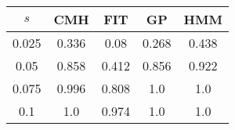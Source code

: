 \centering \begin{tabular}{c|c|c|c|c}
$s$	&CMH	&FIT	&GP	&HMM\\\hline
0.025	&0.336	&0.08	&0.268	&0.438\\
0.05	&0.858	&0.412	&0.856	&0.922\\
0.075	&0.996	&0.808	&1.0	&1.0\\
0.1	&1.0	&0.974	&1.0	&1.0\\
\end{tabular}
